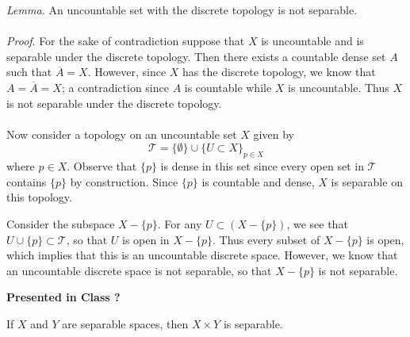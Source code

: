 \documentclass[a4paper,12pt,twoside]{hmcpset}
\begin{document}
\begin{solution}
\noindent \textit{Lemma.} An uncountable set with the discrete topology is not separable. 
\\
\\
\textit{Proof}. For the sake of contradiction suppose that $X$ is
uncountable and is separable under the discrete topology. Then there
exists a countable dense set $A$ such that $\overline{A} = X$.
However, since $X$ has the discrete topology, we know that $A =
\overline{A} = X$; a contradiction since $A$ is countable while $X$ is
uncountable. Thus $X$ is not separable under the discrete topology. 
\\
\\
Now consider a topology on an uncountable set $X$ given by 
\[
    \mathscr{T} = \{ \emptyset\} \cup \{U \subset X \}_{p \in X}
\]
where $p \in X$. Observe that $\{p\}$ is dense in this set since every
open set in $\mathscr{T}$ contains $\{p\}$ by construction. Since
$\{p\}$ is countable and dense, $X$ is separable on this topology. 

Consider the subspace $X - \{p\}$. For any $U \subset (X - \{p\})$, we
see that $U \cup \{p\} \subset \mathscr{T}$, so that $U$ is open in $X
- \{p\}$. Thus every subset of $X - \{p\}$ is open, which implies that
this is an uncountable discrete space. However, we know that an
uncountable discrete space is not separable, so that $X - \{p\}$ is
not separable.
\end{solution}

\noindent
\textbf{Presented in Class ?}\\
\begin{problem}[Theorem 6.5]
    If $X$ and $Y$ are separable spaces, then $X \times Y$ is separable.
\end{problem}
\end{document}

